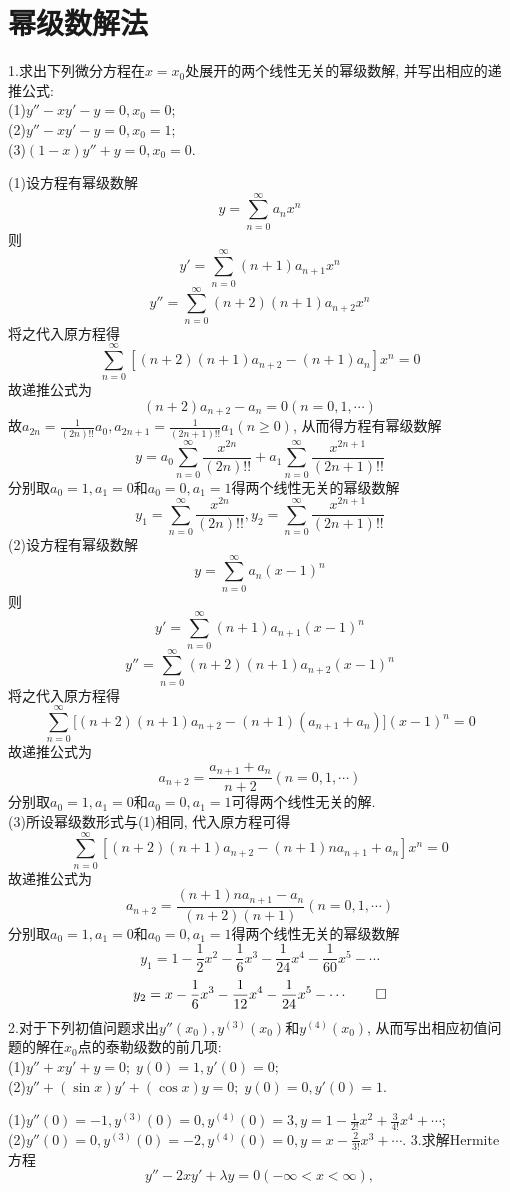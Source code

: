 \documentclass[titlepage,11pt,a4paper,twoside]{report}
\makeatletter
\newenvironment{solve}{\par
	\pushQED{\qed}%
	\normalfont \topsep1\p@\@plus6\p@\relax
	\trivlist
	\item\relax
	{\hspace*{\parindent}{\heiti 解}\@addpunct{:}}\hspace\labelsep\ignorespaces
}{%
	\popQED\endtrivlist\@endpefalse
}
\makeatother
\begin{document}
\section{幂级数解法}
1.求出下列微分方程在$x=x_0$处展开的两个线性无关的幂级数解, 并写出相应的递推公式:\\
(1)$y''-xy'-y=0,x_0=0$;\\
(2)$y''-xy'-y=0,x_0=1$;\\
(3)$(1-x)y''+y=0,x_0=0$.
\begin{solve}
(1)设方程有幂级数解\[y=\sum_{n=0}^{\infty}a_nx^n\] 则
\[y'=\sum_{n=0}^{\infty}(n+1)a_{n+1}x^n\]
\[y''=\sum_{n=0}^{\infty}(n+2)(n+1)a_{n+2}x^n\]
将之代入原方程得\[\sum_{n=0}^{\infty}[(n+2)(n+1)a_{n+2}-(n+1)a_n]x^n=0\]
故递推公式为\[(n+2)a_{n+2}-a_n=0(n=0,1,\cdots)\]
故$a_{2n}=\frac{1}{(2n)!!}a_0,a_{2n+1}=\frac{1}{(2n+1)!!}a_1(n\geq0)$, 从而得方程有幂级数解
\[y=a_0\sum_{n=0}^{\infty}\frac{x^{2n}}{(2n)!!}+a_1\sum_{n=0}^{\infty}\frac{x^{2n+1}}{(2n+1)!!}\]
分别取$a_0=1,a_1=0$和$a_0=0,a_1=1$得两个线性无关的幂级数解
\[y_1=\sum_{n=0}^{\infty}\frac{x^{2n}}{(2n)!!},y_2=\sum_{n=0}^{\infty}\frac{x^{2n+1}}{(2n+1)!!}\]
(2)设方程有幂级数解\[y=\sum_{n=0}^{\infty}a_n(x-1)^n\]
则\[y'=\sum_{n=0}^{\infty}(n+1)a_{n+1}(x-1)^n\]
\[y''=\sum_{n=0}^{\infty}(n+2)(n+1)a_{n+2}(x-1)^n\]
将之代入原方程得
\[\sum_{n=0}^{\infty}\big[(n+2)(n+1)a_{n+2}-(n+1)(a_{n+1}+a_n)\big](x-1)^n=0\]
故递推公式为\[a_{n+2}=\frac{a_{n+1}+a_n}{n+2}(n=0,1,\cdots)\]
分别取$a_0=1,a_1=0$和$a_0=0,a_1=1$可得两个线性无关的解.\\
(3)所设幂级数形式与(1)相同, 代入原方程可得
\[\sum_{n=0}^{\infty}[(n+2)(n+1)a_{n+2}-(n+1)na_{n+1}+a_n]x^n=0\]
故递推公式为
\[a_{n+2}=\frac{(n+1)na_{n+1}-a_n}{(n+2)(n+1)}(n=0,1,\cdots)\]
分别取$a_0=1,a_1=0$和$a_0=0,a_1=1$得两个线性无关的幂级数解
\[y_1=1-\frac{1}{2}x^2-\frac{1}{6}x^3-\frac{1}{24}x^4-\frac{1}{60}x^5-\cdots\]
\[y_2=x-\frac{1}{6}x^3-\frac{1}{12}x^4-\frac{1}{24}x^5-\cdots\qedhere\]
\end{solve}
2.对于下列初值问题求出$y''(x_0),y^{(3)}(x_0)$和$y^{(4)}(x_0)$, 从而写出相应初值问题的解在$x_0$点的泰勒级数的前几项:\\
(1)$y''+xy'+y=0;\;y(0)=1,y'(0)=0;$\\
(2)$y''+(\sin x)y'+(\cos x)y=0;\;y(0)=0,y'(0)=1$.
\begin{solve}
(1)$y''(0)=-1,y^{(3)}(0)=0,y^{(4)}(0)=3,y=1-\frac{1}{2!}x^2+\frac{3}{4!}x^4+\cdots$;\\
(2)$y''(0)=0,y^{(3)}(0)=-2,y^{(4)}(0)=0,y=x-\frac{2}{3!}x^3+\cdots$.
\end{solve}
3.求解Hermite方程
\[y''-2xy'+\lambda y=0(-\infty<x<\infty),\]
\end{document}
